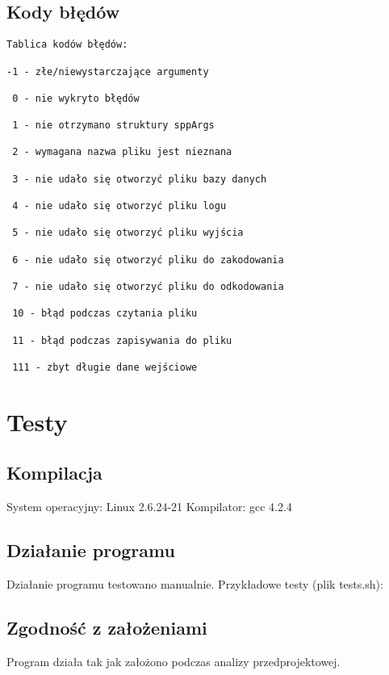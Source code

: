 \documentclass[bibtotocnumbered, headsepline,normalheadings,12pt,polish]{scrreprt}
\begin{document}
\section{Kody błędów}
\begin{verbatim}
Tablica kodów błędów:

-1 - złe/niewystarczające argumenty

 0 - nie wykryto błędów

 1 - nie otrzymano struktury sppArgs

 2 - wymagana nazwa pliku jest nieznana

 3 - nie udało się otworzyć pliku bazy danych

 4 - nie udało się otworzyć pliku logu
 
 5 - nie udało się otworzyć pliku wyjścia
 
 6 - nie udało się otworzyć pliku do zakodowania
 
 7 - nie udało się otworzyć pliku do odkodowania
 
 10 - błąd podczas czytania pliku
 
 11 - błąd podczas zapisywania do pliku
 
 111 - zbyt długie dane wejściowe
\end{verbatim}

\chapter{Testy}
\normalsize
\section{Kompilacja}
System operacyjny: Linux 2.6.24-21
Kompilator: gcc 4.2.4
\section{Działanie programu}
Działanie programu testowano manualnie.
Przykładowe testy (plik tests.sh):
\section{Zgodność z założeniami}
Program działa tak jak założono podczas analizy przedprojektowej.
\end{document}
